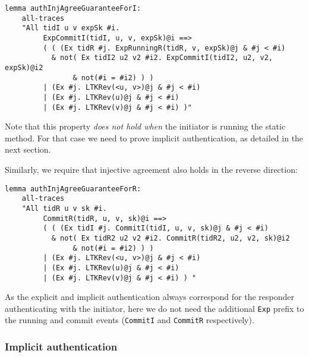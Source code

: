 \begin{lstlisting}
lemma authInjAgreeGuaranteeForI:
    all-traces
    "All tidI u v expSk #i.
         ExpCommitI(tidI, u, v, expSk)@i ==>
         ( ( (Ex tidR #j. ExpRunningR(tidR, v, expSk)@j & #j < #i)
           & not( Ex tidI2 u2 v2 #i2. ExpCommitI(tidI2, u2, v2, expSk)@i2
                & not(#i = #i2) ) )
         | (Ex #j. LTKRev(<u, v>)@j & #j < #i)
         | (Ex #j. LTKRev(u)@j & #j < #i)
         | (Ex #j. LTKRev(v)@j & #j < #i) )"
\end{lstlisting}

Note that this property \emph{does not hold when} the initiator is
running the static method.
%
For that case we need to prove implicit authentication, as detailed in
the next section.

Similarly, we require that injective agreement also holds in the
reverse direction:

\begin{lstlisting}
lemma authInjAgreeGuaranteeForR:
    all-traces
    "All tidR u v sk #i.
         CommitR(tidR, u, v, sk)@i ==>
         ( ( (Ex tidI #j. CommitI(tidI, u, v, sk)@j & #j < #i)
           & not( Ex tidR2 u2 v2 #i2. CommitR(tidR2, u2, v2, sk)@i2
                & not(#i = #i2) ) )
         | (Ex #j. LTKRev(<u, v>)@j & #j < #i)
         | (Ex #j. LTKRev(u)@j & #j < #i)
         | (Ex #j. LTKRev(v)@j & #j < #i) ) "
\end{lstlisting}

As the explicit and implicit authentication always correspond for the
responder authenticating with the initiator, here we do not need the
additional \lstinline{Exp} prefix to the running and commit events
(\lstinline{CommitI} and \lstinline{CommitR} respectively).

\subsubsection{Implicit authentication}

